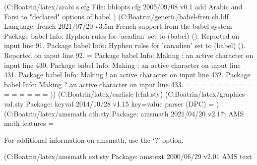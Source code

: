(C:\Users\Landrine Boatrin\AppData\Local\Programs\MiKTeX\tex/latex/arabi\bblopt
s.cfg
File: bblopts.cfg 2005/09/08 v0.1 add Arabic and Farsi to "declared" options of
 babel
)
(C:\Users\Landrine Boatrin\AppData\Local\Programs\MiKTeX\tex/generic/babel-fren
ch\french.ldf
Language: french 2021/07/20 v3.5m French support from the babel system
Package babel Info: Hyphen rules for 'acadian' set to \l@french
(babel)             (). Reported on input line 91.
Package babel Info: Hyphen rules for 'canadien' set to \l@french
(babel)             (). Reported on input line 92.
\FB@nonchar=
Package babel Info: Making : an active character on input line 430.
Package babel Info: Making ; an active character on input line 431.
Package babel Info: Making ! an active character on input line 432.
Package babel Info: Making ? an active character on input line 433.
\FBguill@level=
\FBold@everypar=
\FB@Mht=
\mc@charclass=
\mc@charfam=
\mc@charslot=
\std@mcc=
\dec@mcc=
\listindentFB=
\descindentFB=
=
=
\leftmarginFB=
=
\FBfnindent=
))
(C:\Users\Landrine Boatrin\AppData\Local\Programs\MiKTeX\tex/latex/carlisle\sca
lefnt.sty)
(C:\Users\Landrine Boatrin\AppData\Local\Programs\MiKTeX\tex/latex/graphics\key
val.sty
Package: keyval 2014/10/28 v1.15 key=value parser (DPC)
\KV@toks@=
)
(C:\Users\Landrine Boatrin\AppData\Local\Programs\MiKTeX\tex/latex/amsmath\amsm
ath.sty
Package: amsmath 2021/04/20 v2.17j AMS math features
\@mathmargin=

For additional information on amsmath, use the `?' option.

(C:\Users\Landrine Boatrin\AppData\Local\Programs\MiKTeX\tex/latex/amsmath\amst
ext.sty
Package: amstext 2000/06/29 v2.01 AMS text

